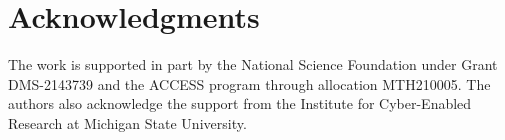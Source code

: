 \documentclass[a4paper,fleqn]{cas-sc}
\theoremstyle{definition}
\theoremstyle{remark}
\begin{document}


\section*{Acknowledgments}
The work is supported in part by the National Science Foundation under Grant DMS-2143739 and the ACCESS program through allocation MTH210005. 
The authors also acknowledge the support from the Institute for Cyber-Enabled Research at Michigan State University.










\end{document}
